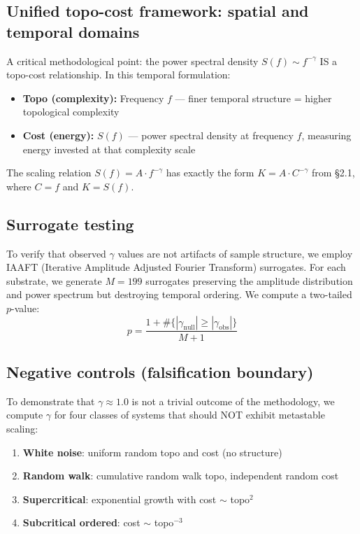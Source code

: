 \documentclass[11pt,a4paper,twocolumn]{article}
\begin{document}
\subsection{Unified topo-cost framework: spatial and temporal domains}

A critical methodological point: the power spectral density $S(f) \sim f^{-\gamma}$ IS a topo-cost relationship. In this temporal formulation:
\begin{itemize}
\item \textbf{Topo (complexity):} Frequency $f$ --- finer temporal structure = higher topological complexity
\item \textbf{Cost (energy):} $S(f)$ --- power spectral density at frequency $f$, measuring energy invested at that complexity scale
\end{itemize}

The scaling relation $S(f) = A \cdot f^{-\gamma}$ has exactly the form $K = A \cdot C^{-\gamma}$ from \S2.1, where $C = f$ and $K = S(f)$.

\subsection{Surrogate testing}

To verify that observed $\gamma$ values are not artifacts of sample structure, we employ IAAFT (Iterative Amplitude Adjusted Fourier Transform) surrogates. For each substrate, we generate $M = 199$ surrogates preserving the amplitude distribution and power spectrum but destroying temporal ordering. We compute a two-tailed $p$-value:
\begin{equation}
p = \frac{1 + \#\{|\gamma_{\text{null}}| \geq |\gamma_{\text{obs}}|\}}{M + 1}
\end{equation}

\subsection{Negative controls (falsification boundary)}

To demonstrate that $\gamma \approx 1.0$ is not a trivial outcome of the methodology, we compute $\gamma$ for four classes of systems that should NOT exhibit metastable scaling:
\begin{enumerate}
\item \textbf{White noise}: uniform random topo and cost (no structure)
\item \textbf{Random walk}: cumulative random walk topo, independent random cost
\item \textbf{Supercritical}: exponential growth with cost $\sim$ topo$^2$
\item \textbf{Subcritical ordered}: cost $\sim$ topo$^{-3}$
\end{enumerate}
\end{document}
